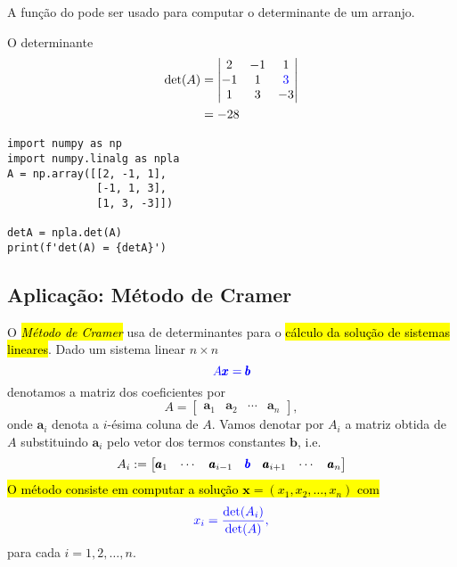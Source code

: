 A função {\PYTHONnumpyDOTlinalgDOTdet} do {\numpy} pode ser usado para computar o determinante de um arranjo.

\begin{ex}
  O determinante
  \begin{subequations}
    \begin{align}
      \det(A) &=
                \begin{vmatrix}
                  2 & -1 & 1\\
                  -1 & 1 & {\color{blue}3}\\
                  1 & 3 & -3
                \end{vmatrix}\\
              &= -28
    \end{align}
  \end{subequations}

\begin{lstlisting}
import numpy as np
import numpy.linalg as npla
A = np.array([[2, -1, 1],
              [-1, 1, 3],
              [1, 3, -3]])

detA = npla.det(A)
print(f'det(A) = {detA}')
\end{lstlisting}

\end{ex}

\subsection{Aplicação: Método de Cramer}

O \hl{\emph{Método de Cramer}}{\cramer} usa de determinantes para o \hl{cálculo da solução de sistemas lineares}. Dado um sistema linear $n\times n$
\begin{equation}\color{blue}A\pmb{x} = \pmb{b}
\end{equation}
denotamos a matriz dos coeficientes por
\begin{equation}
  A =
  \begin{bmatrix}
    \pmb{a}_1 & \pmb{a}_2 & \cdots & \pmb{a}_n
\end{bmatrix},
\end{equation}
onde $\pmb{a}_i$ denota a $i$-ésima coluna de $A$. Vamos denotar por $A_i$ a matriz obtida de $A$ substituindo $\pmb{a}_i$ pelo vetor dos termos constantes $\pmb{b}$, i.e.
\begin{equation}
  A_i :=
  \begin{bmatrix}
    \pmb{a}_1 & \cdots & \pmb{a}_{i-1} & {\color{blue}\pmb{b}} & \pmb{a}_{i+1} & \cdots & \pmb{a}_n
  \end{bmatrix}
\end{equation}
\hl{O método consiste em computar a solução $\pmb{x} = (x_1, x_2, \ldots, x_n)$ com}
\begin{equation}\color{blue}x_i = \frac{\det(A_i)}{\det(A)},
\end{equation}
para cada $i = 1, 2, \dotsc, n$.

